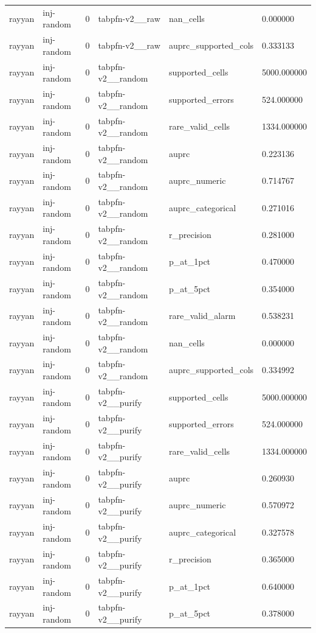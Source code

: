 \begin{tabular}{llllll}
rayyan & inj-random & 0 & tabpfn-v2\_\_raw & nan\_cells & 0.000000 \\
rayyan & inj-random & 0 & tabpfn-v2\_\_raw & auprc\_supported\_cols & 0.333133 \\
rayyan & inj-random & 0 & tabpfn-v2\_\_random & supported\_cells & 5000.000000 \\
rayyan & inj-random & 0 & tabpfn-v2\_\_random & supported\_errors & 524.000000 \\
rayyan & inj-random & 0 & tabpfn-v2\_\_random & rare\_valid\_cells & 1334.000000 \\
rayyan & inj-random & 0 & tabpfn-v2\_\_random & auprc & 0.223136 \\
rayyan & inj-random & 0 & tabpfn-v2\_\_random & auprc\_numeric & 0.714767 \\
rayyan & inj-random & 0 & tabpfn-v2\_\_random & auprc\_categorical & 0.271016 \\
rayyan & inj-random & 0 & tabpfn-v2\_\_random & r\_precision & 0.281000 \\
rayyan & inj-random & 0 & tabpfn-v2\_\_random & p\_at\_1pct & 0.470000 \\
rayyan & inj-random & 0 & tabpfn-v2\_\_random & p\_at\_5pct & 0.354000 \\
rayyan & inj-random & 0 & tabpfn-v2\_\_random & rare\_valid\_alarm & 0.538231 \\
rayyan & inj-random & 0 & tabpfn-v2\_\_random & nan\_cells & 0.000000 \\
rayyan & inj-random & 0 & tabpfn-v2\_\_random & auprc\_supported\_cols & 0.334992 \\
rayyan & inj-random & 0 & tabpfn-v2\_\_purify & supported\_cells & 5000.000000 \\
rayyan & inj-random & 0 & tabpfn-v2\_\_purify & supported\_errors & 524.000000 \\
rayyan & inj-random & 0 & tabpfn-v2\_\_purify & rare\_valid\_cells & 1334.000000 \\
rayyan & inj-random & 0 & tabpfn-v2\_\_purify & auprc & 0.260930 \\
rayyan & inj-random & 0 & tabpfn-v2\_\_purify & auprc\_numeric & 0.570972 \\
rayyan & inj-random & 0 & tabpfn-v2\_\_purify & auprc\_categorical & 0.327578 \\
rayyan & inj-random & 0 & tabpfn-v2\_\_purify & r\_precision & 0.365000 \\
rayyan & inj-random & 0 & tabpfn-v2\_\_purify & p\_at\_1pct & 0.640000 \\
rayyan & inj-random & 0 & tabpfn-v2\_\_purify & p\_at\_5pct & 0.378000 \\

\end{tabular}
